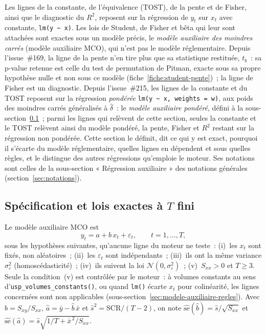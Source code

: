 \documentclass[a4paper,11pt]{article}
\newcommand{\code}[1]{\texttt{\small #1}}
\begin{document}
Les lignes de la constante, de l'équivalence (TOST), de la pente et de Fisher, ainsi que le
diagnostic du $R^2$, reposent sur la régression de $y_t$ sur $x_t$ avec constante,
\code{lm(y \textasciitilde\ x)}. Les lois de Student, de Fisher et bêta qui leur sont attachées
sont exactes sous un modèle précis, le \emph{modèle auxiliaire des moindres carrés} (modèle
auxiliaire MCO), qui n'est pas le modèle réglementaire. Depuis l'issue~\#169, la ligne de la
pente n'en tire plus que sa statistique restituée, $t_b$~: sa p-value retenue est celle du test
de permutation de Pitman, exacte sous sa propre hypothèse nulle et non sous ce modèle
(fiche~\ref{fiche:student-pente})~; la ligne de Fisher est un diagnostic. Depuis l'issue~\#215,
les lignes de la constante et du TOST reposent sur la régression \emph{pondérée}
\code{lm(y \textasciitilde\ x, weights = w)}, aux poids des moindres carrés généralisés à
$\hat\delta$~: le \emph{modèle auxiliaire pondéré}, défini à la
sous-section~\ref{sec:modele-auxiliaire-spec}~; parmi les lignes qui relèvent de cette section,
seules la constante et le TOST relèvent ainsi du modèle pondéré, la pente, Fisher et $R^2$ restant
sur la régression non pondérée. Cette section le définit, dit ce qui y
est exact, pourquoi il s'écarte du modèle réglementaire, quelles lignes en dépendent et sous
quelles règles, et le distingue des autres régressions qu'emploie le moteur. Ses notations sont
celles de la sous-section « Régression auxiliaire » des notations générales
(section~\ref{sec:notations}).

\subsection{Spécification et lois exactes à $T$ fini}
\label{sec:modele-auxiliaire-spec}

Le modèle auxiliaire MCO est
\[
  y_t = a + b\,x_t + \varepsilon_t, \qquad t = 1, \dots, T,
\]
sous les hypothèses suivantes, qu'aucune ligne du moteur ne teste~: (i)~les $x_t$ sont fixés,
non aléatoires~; (ii)~les $\varepsilon_t$ sont indépendants~; (iii)~ils ont la même variance
$\sigma_\varepsilon^2$ (homoscédasticité)~; (iv)~ils suivent la loi $\mathcal{N}(0,
\sigma_\varepsilon^2)$~; (v)~$S_{xx} > 0$ et $T \ge 3$. Seule la condition~(v) est contrôlée par
le moteur~: à volumes constants au sens d'\code{usp\_volumes\_constants()}, ou quand \code{lm()}
écarte $x_t$ pour colinéarité, les lignes concernées sont non applicables
(sous-section~\ref{sec:modele-auxiliaire-regles}). Avec $\hat b = S_{xy}/S_{xx}$,
$\hat a = \bar y - \hat b\,\bar x$ et $\hat s^2 = \mathrm{SCR}/(T-2)$, on note
$\widehat{\mathrm{se}}(\hat b) = \hat s/\sqrt{S_{xx}}$ et
$\widehat{\mathrm{se}}(\hat a) = \hat s\sqrt{1/T + \bar x^{\,2}/S_{xx}}$.
\end{document}
